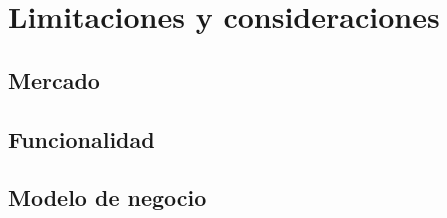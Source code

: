 
\chapter{Limitaciones y consideraciones} %

\label{Chapter2} %




\section{Mercado}
\section{Funcionalidad}
\section{Modelo de negocio}

